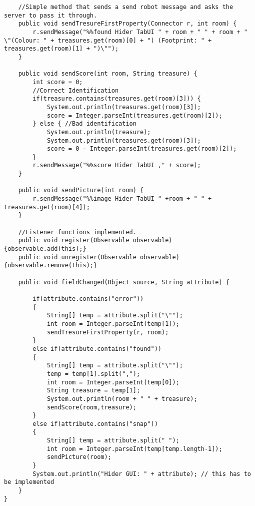 \begin{lstlisting}
	//Simple method that sends a send robot message and asks the server to pass it through.
	public void sendTresureFirstProperty(Connector r, int room) {
		r.sendMessage("%%found Hider TabUI " + room + " " + room + " \"(Colour: " + treasures.get(room)[0] + ") (Footprint: " + treasures.get(room)[1] + ")\"");
	}

	public void sendScore(int room, String treasure) {
		int score = 0;
		//Correct Identification
		if(treasure.contains(treasures.get(room)[3])) {
			System.out.println(treasures.get(room)[3]);
			score = Integer.parseInt(treasures.get(room)[2]);
		} else { //Bad identification
			System.out.println(treasure);
			System.out.println(treasures.get(room)[3]);
			score = 0 - Integer.parseInt(treasures.get(room)[2]);
		}
		r.sendMessage("%%score Hider TabUI ," + score);
	}

	public void sendPicture(int room) {
		r.sendMessage("%%image Hider TabUI " +room + " " + treasures.get(room)[4]);
	}

	//Listener functions implemented.
	public void register(Observable observable) {observable.add(this);}
  	public void unregister(Observable observable) {observable.remove(this);}

  	public void fieldChanged(Object source, String attribute) {

  		if(attribute.contains("error")) 
  		{
  			String[] temp = attribute.split("\"");
  			int room = Integer.parseInt(temp[1]);
  			sendTresureFirstProperty(r, room);
  		} 
  		else if(attribute.contains("found")) 
  		{
  			String[] temp = attribute.split("\"");
  			temp = temp[1].split(",");
  			int room = Integer.parseInt(temp[0]);
  			String treasure = temp[1];
  			System.out.println(room + " " + treasure);
  			sendScore(room,treasure);
  		} 
  		else if(attribute.contains("snap")) 
  		{
  			String[] temp = attribute.split(" ");
  			int room = Integer.parseInt(temp[temp.length-1]);
  			sendPicture(room);
  		}
    	System.out.println("Hider GUI: " + attribute); // this has to be implemented
  	}
}
\end{lstlisting}
